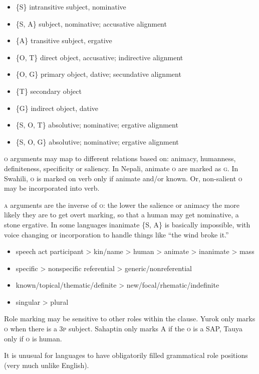 \documentclass[11pt]{article}
\newcommand{\I}[1]{\textsc{#1}}   %
\newenvironment{grammarlist}%
 {\begin{itemize}\addtolength{\itemsep}{-0.5\baselineskip}\ignorespaces}%
 {\end{itemize}\ignorespacesafterend}
\begin{document}
\begin{grammarlist}
  \item \{\I{S}\} intransitive subject, nominative
  \item \{\I{S, A}\} subject, nominative; accusative alignment
  \item \{\I{A}\} transitive subject, ergative
  \item \{\I{O, T}\} direct object, accusative; indirective alignment
  \item \{\I{O, G}\} primary object, dative; secundative alignment
  \item \{\I{T}\} secondary object
  \item \{\I{G}\} indirect object, dative
  \item \{\I{S, O, T}\} absolutive; nominative; ergative alignment
  \item \{\I{S, O, G}\} absolutive; nominative; ergative alignment
\end{grammarlist}

\I{o} arguments may map to different relations based on: animacy,
humanness, definiteness, specificity or saliency.  In Nepali, animate
\I{o} are marked as \I{g}.  In Swahili, \I{o} is marked on verb only
if animate and/or known.  Or, non-salient \I{o} may be incorporated
into verb.

\I{a} arguments are the inverse of \I{o}: the lower the salience or
animacy the more likely they are to get overt marking, so that a human
may get nominative, a stone ergative.  In some languages inanimate
\{\I{S, A}\} is basically impossible, with voice changing or
incorporation to handle things like ``the wind broke it.''

\begin{grammarlist}
  \item speech act participant > kin/name > human > animate >
    inanimate > mass
  \item specific > nonspecific referential > generic/nonreferential
  \item known/topical/thematic/definite > new/focal/rhematic/indefinite
  \item singular > plural
\end{grammarlist}

Role marking may be sensitive to other roles within the clause.  Yurok
only marks \I{o} when there is a \I{3p} subject.  Sahaptin only marks
\I{A} if the \I{o} is a SAP, Tauya only if \I{o} is human.

It is unusual for languages to have obligatorily filled grammatical
role positions (very much unlike English).
\end{document}
